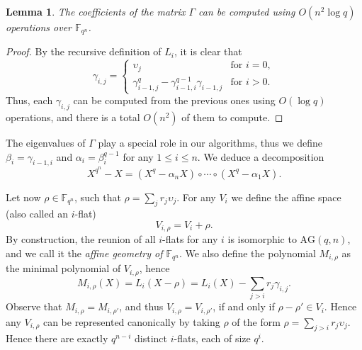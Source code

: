 \documentclass{sig-alternate}
\newcommand{\ff}[1]{\mathbb{F}_{#1}}
\newcommand{\qq}{q}
\newcommand{\nn}{n}
\newcommand{\qn}{{\qq^\nn}}
\newcommand{\extf}{\ff{\qn}}
\newcommand{\AG}{\mathrm{AG}(\qq,\nn)}
\newcounter{algo}
\newtheorem{Lem}{Lemma}
\renewcommand{\paragraph}[1]{\smallskip\noindent{{\bf \rm #1.}}}
\begin{document}
\begin{Lem}
  \label{lem:gamma}
  The coefficients of the matrix $\Gamma$ can be computed using
  $O(\nn^2\log\qq)$ operations over $\extf$.
\end{Lem}
\begin{proof}
  By the recursive definition of $L_i$, it is clear that
  \begin{equation}
    \gamma_{i,j} =
    \begin{cases}
      \upsilon_j &\text{for $i=0$},\\
      \gamma_{i-1,j}^\qq - \gamma_{i-1,i}^{\qq-1}\gamma_{i-1,j} &\text{for $i>0$}.
    \end{cases}
  \end{equation}
  Thus, each $\gamma_{i,j}$ can be computed from the previous ones
  using $O(\log\qq)$ operations, and there is a total $O(\nn^2)$ of
  them to compute.
\end{proof}

The eigenvalues of $\Gamma$ play a special role in our algorithms,
thus we define $\beta_i=\gamma_{i-1,i}$ and $\alpha_i=\beta_i^{\qq-1}$
for any $1\le i \le \nn$. We deduce a decomposition
\begin{equation}
\label{decomposition_field_eq_gen}
  X^\qn - X = (X^\qq - \alpha_\nn X) \circ \cdots \circ (X^\qq - \alpha_1 X).
\end{equation}

\paragraph{The affine geometry of $\extf$} 
Let now $\rho\in\extf$, such that $\rho=\sum_jr_j\upsilon_j$.  For any
$V_i$ we define the affine space (also called an $i$-flat)
\begin{equation}
  V_{i,\rho} = V_i + \rho.
\end{equation}
By construction, the reunion of all $i$-flats for any $i$ is
isomorphic to $\AG$, and we call it the \emph{affine geometry of
  $\extf$}. We also define the polynomial $M_{i,\rho}$ as the minimal
polynomial of $V_{i,\rho}$, hence
\begin{equation}
  M_{i,\rho}(X) = L_i(X - \rho) = L_i(X) - \sum_{j>i}r_j\gamma_{i,j}.
\end{equation}
Observe that $M_{i,\rho}=M_{i,\rho'}$, and thus
$V_{i,\rho}=V_{i,\rho'}$, if and only if $\rho-\rho'\in V_i$. Hence
any $V_{i,\rho}$ can be represented canonically by taking $\rho$ of
the form $\rho=\sum_{j>i}r_j\upsilon_j$. Hence there are exactly
$\qq^{n-i}$ distinct $i$-flats, each of size $\qq^i$.
\end{document}
